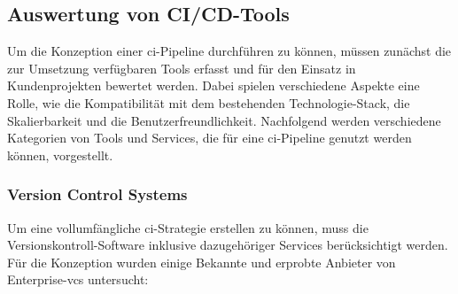 \subsection{Auswertung von CI/CD-Tools} \label{subsec:03-concept-2}

Um die Konzeption einer \acrshort{ci}-Pipeline durchführen zu können, müssen zunächst die zur Umsetzung verfügbaren
Tools erfasst und für den Einsatz in Kundenprojekten bewertet werden.
Dabei spielen verschiedene Aspekte eine Rolle, wie die Kompatibilität mit dem bestehenden Technologie-Stack, die
Skalierbarkeit und die Benutzerfreundlichkeit.
Nachfolgend werden verschiedene Kategorien von Tools und Services, die für eine \acrshort{ci}-Pipeline genutzt werden
können, vorgestellt.

\subsubsection{Version Control Systems}

Um eine vollumfängliche \acrshort{ci}-Strategie erstellen zu können, muss die Versionskontroll-Software inklusive
dazugehöriger Services berücksichtigt werden.
Für die Konzeption wurden einige Bekannte und erprobte Anbieter von Enterprise-\acrshort{vcs} untersucht:

